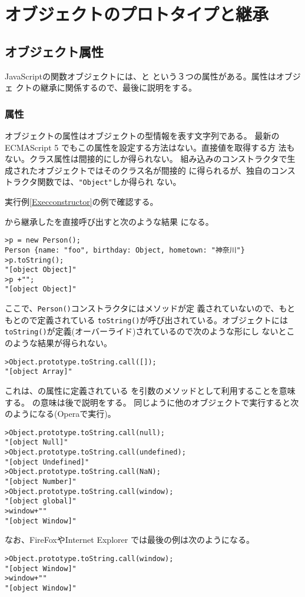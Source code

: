 \chapter{オブジェクトのプロトタイプと継承}
\section{オブジェクト属性}
JavaScriptの関数オブジェクトには、と
という３つの属性がある。属性はオブジェ
クトの継承に関係するので、最後に説明をする。
\subsection{\protect{}属性}
オブジェクトの属性はオブジェクトの型情報を表す文字列である。
最新の ECMAScript 5 でもこの属性を設定する方法はない。直接値を取得する方
法もない。クラス属性は間接的にしか得られない。
組み込みのコンストラクタで生成されたオブジェクトではそのクラス名が間接的
に得られるが、独自のコンストラクタ関数では、\texttt{"Object"}しか得られ
ない。
\begin{Exec}\upshape\label{}
実行例\ref{Execconstructor}の例で確認する。
 \iffalse
\begin{Verbatim}
function Person(){
  this.name = "foo";
  this.birthday = {
    year : 2001,
    month : 4,
    day : 1
  };
  this["hometown"] = "神奈川";
}
\end{Verbatim}
\fi
\end{Exec}
から継承したを直接呼び出すと次のような結果
になる。
\begin{Verbatim}
>p = new Person();
Person {name: "foo", birthday: Object, hometown: "神奈川"}
>p.toString();
"[object Object]"
>p +"";
"[object Object]"
\end{Verbatim}
ここで、\texttt{Person()}コンストラクタにはメソッドが定
義されていないので、もともとので定義されている
\texttt{toString()}が呼び出されている。オブジェクトには
\texttt{toString()}が定義(オーバーライド)されているので次のような形にし
ないとこのような結果が得られない。
\begin{Verbatim}
>Object.prototype.toString.call([]);
"[object Array]"
\end{Verbatim}
これは、の属性に定義されている
を引数のメソッドとして利用することを意味する。
の意味は後で説明をする。
同じように他のオブジェクトで実行すると次のようになる(Operaで実行)。
\begin{Verbatim}
>Object.prototype.toString.call(null);
"[object Null]"
>Object.prototype.toString.call(undefined);
"[object Undefined]"
>Object.prototype.toString.call(NaN);
"[object Number]"
>Object.prototype.toString.call(window);
"[object global]"
>window+""
"[object Window]"
\end{Verbatim}
なお、FireFoxやInternet Explorer では最後の例は次のようになる。
\begin{Verbatim}
>Object.prototype.toString.call(window);
"[object Window]"
>window+""
"[object Window]"
\end{Verbatim}
